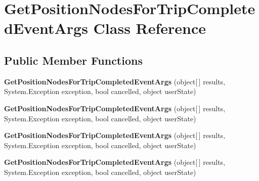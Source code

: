 \hypertarget{class_get_position_nodes_for_trip_completed_event_args}{
\section{GetPositionNodesForTripCompletedEventArgs Class Reference}
\label{class_get_position_nodes_for_trip_completed_event_args}
}
\subsection*{Public Member Functions}
\begin{DoxyCompactItemize}
\item 
\hypertarget{class_get_position_nodes_for_trip_completed_event_args_a6663a262d1a296906a4ea6faba6bb10b}{
{\bfseries GetPositionNodesForTripCompletedEventArgs} (object\mbox{[}$\,$\mbox{]} results, System.Exception exception, bool cancelled, object userState)}
\label{class_get_position_nodes_for_trip_completed_event_args_a6663a262d1a296906a4ea6faba6bb10b}

\item 
\hypertarget{class_get_position_nodes_for_trip_completed_event_args_a6663a262d1a296906a4ea6faba6bb10b}{
{\bfseries GetPositionNodesForTripCompletedEventArgs} (object\mbox{[}$\,$\mbox{]} results, System.Exception exception, bool cancelled, object userState)}
\label{class_get_position_nodes_for_trip_completed_event_args_a6663a262d1a296906a4ea6faba6bb10b}

\item 
\hypertarget{class_get_position_nodes_for_trip_completed_event_args_a6663a262d1a296906a4ea6faba6bb10b}{
{\bfseries GetPositionNodesForTripCompletedEventArgs} (object\mbox{[}$\,$\mbox{]} results, System.Exception exception, bool cancelled, object userState)}
\label{class_get_position_nodes_for_trip_completed_event_args_a6663a262d1a296906a4ea6faba6bb10b}

\item 
\hypertarget{class_get_position_nodes_for_trip_completed_event_args_a6663a262d1a296906a4ea6faba6bb10b}{
{\bfseries GetPositionNodesForTripCompletedEventArgs} (object\mbox{[}$\,$\mbox{]} results, System.Exception exception, bool cancelled, object userState)}
\label{class_get_position_nodes_for_trip_completed_event_args_a6663a262d1a296906a4ea6faba6bb10b}

\end{DoxyCompactItemize}
